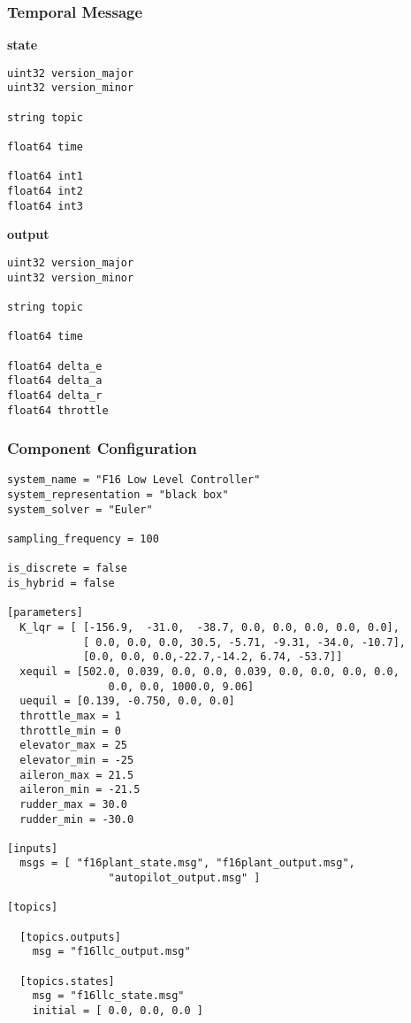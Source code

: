 \subsubsection*{Temporal Message}

\textbf{state}
\begin{lstlisting}	
uint32 version_major
uint32 version_minor

string topic

float64 time

float64 int1
float64 int2
float64 int3
\end{lstlisting}

\textbf{output}
\begin{lstlisting}
uint32 version_major
uint32 version_minor

string topic

float64 time

float64 delta_e
float64 delta_a
float64 delta_r
float64 throttle
\end{lstlisting}

\subsubsection*{Component Configuration}

\begin{lstlisting}	
system_name = "F16 Low Level Controller"
system_representation = "black box"
system_solver = "Euler"

sampling_frequency = 100

is_discrete = false
is_hybrid = false

[parameters]
  K_lqr = [ [-156.9,  -31.0,  -38.7, 0.0, 0.0, 0.0, 0.0, 0.0],
            [ 0.0, 0.0, 0.0, 30.5, -5.71, -9.31, -34.0, -10.7],
            [0.0, 0.0, 0.0,-22.7,-14.2, 6.74, -53.7]]
  xequil = [502.0, 0.039, 0.0, 0.0, 0.039, 0.0, 0.0, 0.0, 0.0, 
  				0.0, 0.0, 1000.0, 9.06]
  uequil = [0.139, -0.750, 0.0, 0.0]
  throttle_max = 1
  throttle_min = 0
  elevator_max = 25
  elevator_min = -25
  aileron_max = 21.5
  aileron_min = -21.5
  rudder_max = 30.0
  rudder_min = -30.0

[inputs]
  msgs = [ "f16plant_state.msg", "f16plant_output.msg", 
  				"autopilot_output.msg" ]

[topics]

  [topics.outputs]
    msg = "f16llc_output.msg"

  [topics.states]
    msg = "f16llc_state.msg"
    initial = [ 0.0, 0.0, 0.0 ]
\end{lstlisting}
%
%
%
%

